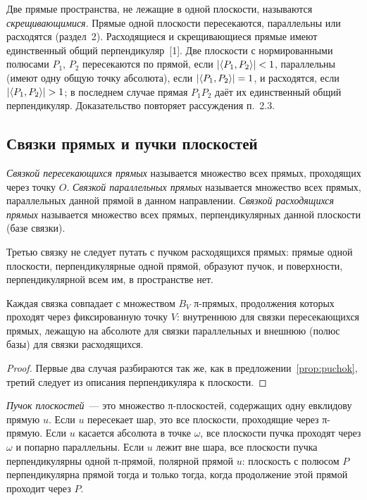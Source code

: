 Две прямые пространства, не лежащие в одной плоскости, называются \emph{скрещивающимися}. Прямые одной плоскости пересекаются, параллельны или расходятся (раздел~2). Расходящиеся и скрещивающиеся прямые имеют единственный общий перпендикуляр~[1]. Две плоскости с нормированными полюсами $P_1$, $P_2$ пересекаются по прямой, если $|\langle P_1,P_2\rangle|<1$, параллельны (имеют одну общую точку абсолюта), если $|\langle P_1,P_2\rangle|=1$, и расходятся, если $|\sk{P_1}{P_2}|>1$; в последнем случае прямая $P_1P_2$ даёт их единственный общий перпендикуляр. Доказательство повторяет рассуждения п.~2.3.

\subsection{Связки прямых и пучки плоскостей}

\begin{definition}[\!\!{[1]}]
\emph{Связкой пересекающихся прямых} называется множество всех прямых, проходящих через точку $O$. \emph{Связкой параллельных прямых} называется множество всех прямых, параллельных данной прямой в данном направлении. \emph{Связкой расходящихся прямых} называется множество всех прямых, перпендикулярных данной плоскости (базе связки).
\end{definition}

Третью связку не следует путать с пучком расходящихся прямых: прямые одной плоскости, перпендикулярные одной прямой, образуют пучок, и поверхности, перпендикулярной всем им, в пространстве нет.

\begin{proposition}\label{prop:svyazka}
Каждая связка совпадает с множеством $B_V$ π-прямых, продолжения которых проходят через фиксированную точку $V$: внутреннюю для связки пересекающихся прямых, лежащую на абсолюте для связки параллельных и внешнюю (полюс базы) для связки расходящихся.
\end{proposition}
\begin{proof}
Первые два случая разбираются так же, как в предложении~\ref{prop:puchok}, третий следует из описания перпендикуляра к плоскости.
\end{proof}

\emph{Пучок плоскостей}~--- это множество π-плоскостей, содержащих одну евклидову прямую $u$. Если $u$ пересекает шар, это все плоскости, проходящие через π-прямую. Если $u$ касается абсолюта в точке $\omega$, все плоскости пучка проходят через $\omega$ и попарно параллельны. Если $u$ лежит вне шара, все плоскости пучка перпендикулярны одной π-прямой, полярной прямой $u$: плоскость с полюсом $P$ перпендикулярна прямой тогда и только тогда, когда продолжение этой прямой проходит через $P$.

